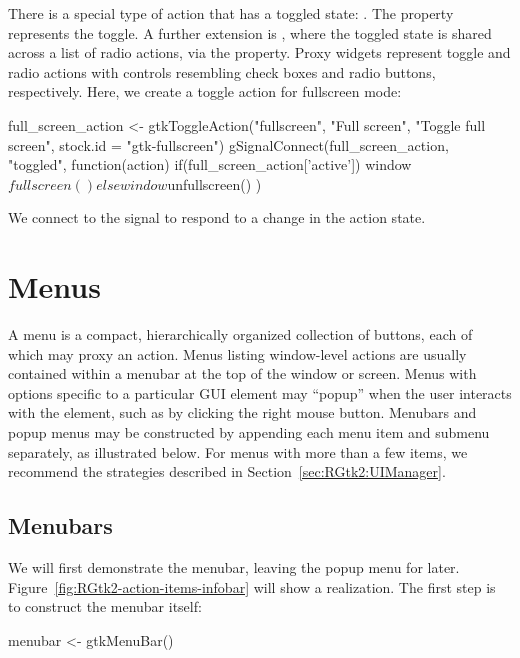 There is a special type of action that has a toggled state:
. The  property represents the
toggle. A further extension is , where the
toggled state is shared across a list of radio actions, via the
 property. Proxy widgets represent toggle and radio
actions with controls resembling check boxes and radio buttons,
respectively. Here, we create a toggle action for fullscreen mode:
\begin{Schunk}
\begin{Sinput}
 full_screen_action <- 
   gtkToggleAction("fullscreen", "Full screen", 
                   "Toggle full screen",
                   stock.id = "gtk-fullscreen")
 gSignalConnect(full_screen_action, "toggled", function(action) {
   if(full_screen_action['active'])
     window$fullscreen()
   else
     window$unfullscreen()
 })
\end{Sinput}
\end{Schunk}
%
We connect to the  signal to respond to a change in the
action state.


\section{Menus}
\label{sec:RGtk2:menus}

A menu is a compact, hierarchically organized collection of buttons,
each of which may proxy an action. Menus listing window-level actions
are usually contained within a menubar at the top of the window or
screen. Menus with options specific to a particular GUI element may
``popup'' when the user interacts with the element, such as by
clicking the right mouse button. Menubars and popup menus may be
constructed by appending each menu item and submenu separately, as
illustrated below. For menus with more than a few items, we recommend
the strategies described in Section~\ref{sec:RGtk2:UIManager}.

\subsection{Menubars}

We will first demonstrate the menubar, leaving the popup menu for
later. Figure~\ref{fig:RGtk2-action-items-infobar} will show a
realization. The first step is to construct the menubar itself:
\begin{Schunk}
\begin{Sinput}
 menubar <- gtkMenuBar()
\end{Sinput}
\end{Schunk}


